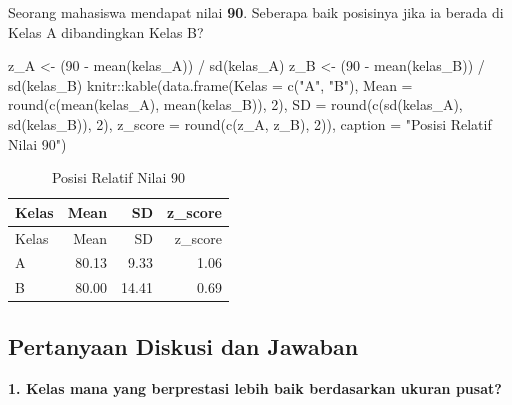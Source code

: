 \documentclass[
  indonesian,
  letterpaper,
]{book}
\newenvironment{Shaded}{\begin{snugshade}}{\end{snugshade}}
\newcommand{\AttributeTok}[1]{\textcolor[rgb]{0.40,0.45,0.13}{#1}}
\newcommand{\DecValTok}[1]{\textcolor[rgb]{0.68,0.00,0.00}{#1}}
\newcommand{\FunctionTok}[1]{\textcolor[rgb]{0.28,0.35,0.67}{#1}}
\newcommand{\NormalTok}[1]{\textcolor[rgb]{0.00,0.23,0.31}{#1}}
\newcommand{\OtherTok}[1]{\textcolor[rgb]{0.00,0.23,0.31}{#1}}
\newcommand{\SpecialCharTok}[1]{\textcolor[rgb]{0.37,0.37,0.37}{#1}}
\newcommand{\StringTok}[1]{\textcolor[rgb]{0.13,0.47,0.30}{#1}}
\begin{document}
Seorang mahasiswa mendapat nilai \textbf{90}. Seberapa baik posisinya
jika ia berada di Kelas A dibandingkan Kelas B?

\begin{Shaded}
\begin{Highlighting}[]
\NormalTok{z\_A }\OtherTok{\textless{}{-}}\NormalTok{ (}\DecValTok{90} \SpecialCharTok{{-}} \FunctionTok{mean}\NormalTok{(kelas\_A)) }\SpecialCharTok{/} \FunctionTok{sd}\NormalTok{(kelas\_A)}
\NormalTok{z\_B }\OtherTok{\textless{}{-}}\NormalTok{ (}\DecValTok{90} \SpecialCharTok{{-}} \FunctionTok{mean}\NormalTok{(kelas\_B)) }\SpecialCharTok{/} \FunctionTok{sd}\NormalTok{(kelas\_B)}
\NormalTok{knitr}\SpecialCharTok{::}\FunctionTok{kable}\NormalTok{(}\FunctionTok{data.frame}\NormalTok{(}\AttributeTok{Kelas =} \FunctionTok{c}\NormalTok{(}\StringTok{"A"}\NormalTok{, }\StringTok{"B"}\NormalTok{),}
\AttributeTok{Mean =} \FunctionTok{round}\NormalTok{(}\FunctionTok{c}\NormalTok{(}\FunctionTok{mean}\NormalTok{(kelas\_A), }\FunctionTok{mean}\NormalTok{(kelas\_B)), }\DecValTok{2}\NormalTok{),}
\AttributeTok{SD =} \FunctionTok{round}\NormalTok{(}\FunctionTok{c}\NormalTok{(}\FunctionTok{sd}\NormalTok{(kelas\_A), }\FunctionTok{sd}\NormalTok{(kelas\_B)), }\DecValTok{2}\NormalTok{),}
\AttributeTok{z\_score =} \FunctionTok{round}\NormalTok{(}\FunctionTok{c}\NormalTok{(z\_A, z\_B), }\DecValTok{2}\NormalTok{)),}
\AttributeTok{caption =} \StringTok{"Posisi Relatif Nilai 90"}\NormalTok{)}
\end{Highlighting}
\end{Shaded}

\begin{longtable}[]{@{}lrrr@{}}
\caption{Posisi Relatif Nilai 90}\tabularnewline
\toprule\noalign{}
Kelas & Mean & SD & z\_score \\
\midrule\noalign{}
\endfirsthead
\toprule\noalign{}
Kelas & Mean & SD & z\_score \\
\midrule\noalign{}
\endhead
\bottomrule\noalign{}
\endlastfoot
A & 80.13 & 9.33 & 1.06 \\
B & 80.00 & 14.41 & 0.69 \\
\end{longtable}

\subsection{Pertanyaan Diskusi dan
Jawaban}\label{pertanyaan-diskusi-dan-jawaban-4}

\textbf{1. Kelas mana yang berprestasi lebih baik berdasarkan ukuran
pusat?}
\end{document}
